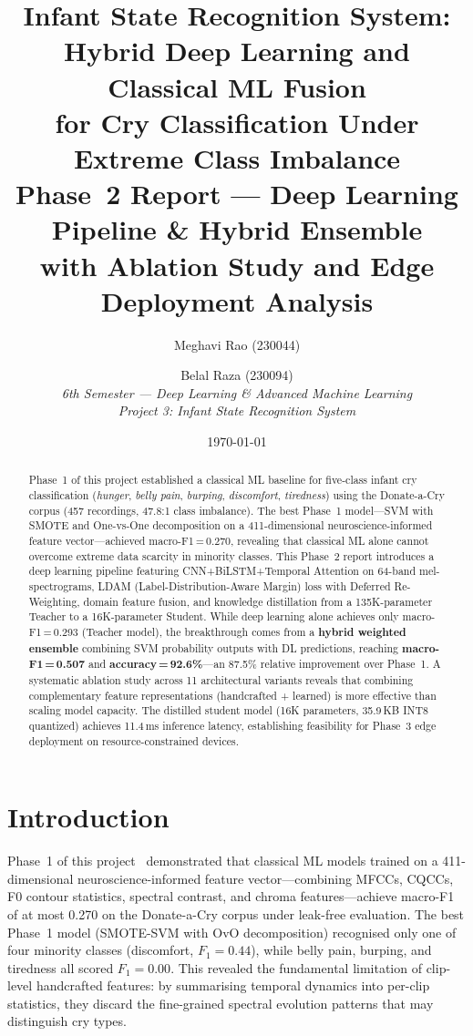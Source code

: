 \documentclass[11pt,a4paper]{article}
\title{%
  \textbf{Infant State Recognition System}:\\[4pt]
  \textbf{Hybrid Deep Learning and Classical ML Fusion}\\
  \textbf{for Cry Classification Under Extreme Class Imbalance}\\[10pt]
  \large Phase~2 Report --- Deep Learning Pipeline \& Hybrid Ensemble\\
  \large with Ablation Study and Edge Deployment Analysis
}
\author{
  Meghavi Rao (230044) \and Belal Raza (230094) \\[4pt]
  \textit{6th Semester --- Deep Learning \& Advanced Machine Learning} \\
  \textit{Project 3: Infant State Recognition System}
}
\date{\today}
\begin{document}
\maketitle

\begin{abstract}
Phase~1 of this project established a classical ML baseline for
five-class infant cry classification (\textit{hunger},
\textit{belly pain}, \textit{burping}, \textit{discomfort},
\textit{tiredness}) using the Donate-a-Cry corpus (457 recordings,
47.8:1 class imbalance). The best Phase~1 model---SVM with SMOTE and
One-vs-One decomposition on a 411-dimensional neuroscience-informed
feature vector---achieved macro-F1\,=\,0.270, revealing that classical
ML alone cannot overcome extreme data scarcity in minority classes.
This Phase~2 report introduces a deep learning pipeline featuring
CNN+BiLSTM+Temporal Attention on 64-band mel-spectrograms, LDAM
(Label-Distribution-Aware Margin) loss with Deferred Re-Weighting,
domain feature fusion, and knowledge distillation from a 135K-parameter
Teacher to a 16K-parameter Student. While deep learning alone achieves
only macro-F1\,=\,0.293 (Teacher model), the breakthrough comes from a
\textbf{hybrid weighted ensemble} combining SVM probability outputs with
DL predictions, reaching \textbf{macro-F1\,=\,0.507} and
\textbf{accuracy\,=\,92.6\%}---an 87.5\% relative improvement over
Phase~1. A systematic ablation study across 11 architectural variants
reveals that combining complementary feature representations
(handcrafted + learned) is more effective than scaling model capacity.
The distilled student model (16K parameters, 35.9\,KB INT8 quantized)
achieves 11.4\,ms inference latency, establishing feasibility for
Phase~3 edge deployment on resource-constrained devices.
\end{abstract}

\section{Introduction}
\label{sec:intro}

Phase~1 of this project~\cite{phase1report} demonstrated that classical
ML models trained on a 411-dimensional neuroscience-informed feature
vector---combining MFCCs, CQCCs, F0 contour statistics, spectral
contrast, and chroma features---achieve macro-F1 of at most 0.270 on the
Donate-a-Cry corpus under leak-free evaluation. The best Phase~1 model
(SMOTE-SVM with OvO decomposition) recognised only one of four minority
classes (discomfort, $F_1 = 0.44$), while belly pain, burping, and
tiredness all scored $F_1 = 0.00$. This revealed the fundamental
limitation of clip-level handcrafted features: by summarising temporal
dynamics into per-clip statistics, they discard the fine-grained
spectral evolution patterns that may distinguish cry types.
\end{document}
